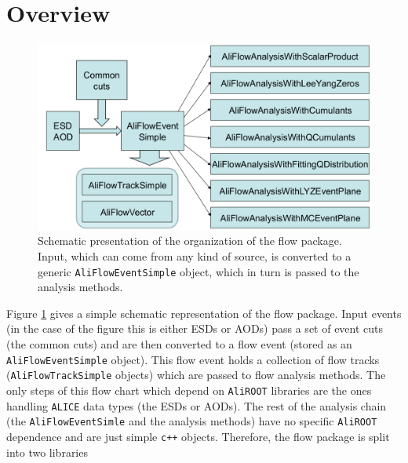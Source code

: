 \documentclass[a4paper]{book}
\numberwithin{equation}{subsection}
\begin{document}
\section{Overview}
\begin{figure}
\begin{center}
\includegraphics[width=.75\textwidth]{figs/flowChart.png}
\caption{Schematic presentation of the organization of the flow package. Input, which can come from any kind of source, is converted to a generic \texttt{AliFlowEventSimple} object, which in turn is passed to the analysis methods.}
\label{fig:flowchart}
\end{center}
\end{figure}
Figure \ref{fig:flowchart} gives a simple schematic representation of the flow package. Input events (in the case of the figure this is either ESDs or AODs) pass a set of event cuts (the common cuts) and are then converted to a flow event (stored as an \texttt{AliFlowEventSimple} object). This flow event holds a collection of flow tracks (\texttt{AliFlowTrackSimple} objects) which are passed to flow analysis methods. The only steps of this flow chart which depend on \texttt{AliROOT} libraries are the ones handling \texttt{ALICE} data types (the ESDs or AODs). The rest of the analysis chain (the \texttt{AliFlowEventSimle} and the analysis methods) have no specific \texttt{AliROOT} dependence and are just simple \texttt{c++} objects. Therefore, the flow package is split into two libraries
\end{document}
